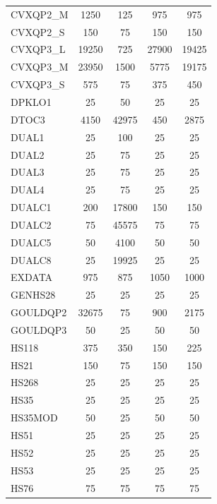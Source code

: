 \begin{longtable}{lcccc}
CVXQP2\_M &     1250 &   125 &      975 &      975 \\
CVXQP2\_S &      150 &    75 &      150 &      150 \\
CVXQP3\_L &    19250 &   725 &    27900 &    19425 \\
CVXQP3\_M &    23950 &  1500 &     5775 &    19175 \\
CVXQP3\_S &      575 &    75 &      375 &      450 \\
DPKLO1   &       25 &    50 &       25 &       25 \\
DTOC3    &     4150 & 42975 &      450 &     2875 \\
DUAL1    &       25 &   100 &       25 &       25 \\
DUAL2    &       25 &    75 &       25 &       25 \\
DUAL3    &       25 &    75 &       25 &       25 \\
DUAL4    &       25 &    75 &       25 &       25 \\
DUALC1   &      200 & 17800 &      150 &      150 \\
DUALC2   &       75 & 45575 &       75 &       75 \\
DUALC5   &       50 &  4100 &       50 &       50 \\
DUALC8   &       25 & 19925 &       25 &       25 \\
EXDATA   &      975 &   875 &     1050 &     1000 \\
GENHS28  &       25 &    25 &       25 &       25 \\
GOULDQP2 &    32675 &    75 &      900 &     2175 \\
GOULDQP3 &       50 &    25 &       50 &       50 \\
HS118    &      375 &   350 &      150 &      225 \\
HS21     &      150 &    75 &      150 &      150 \\
HS268    &       25 &    25 &       25 &       25 \\
HS35     &       25 &    25 &       25 &       25 \\
HS35MOD  &       50 &    25 &       50 &       50 \\
HS51     &       25 &    25 &       25 &       25 \\
HS52     &       25 &    25 &       25 &       25 \\
HS53     &       25 &    25 &       25 &       25 \\
HS76     &       75 &    75 &       75 &       75 \\

\end{longtable}
